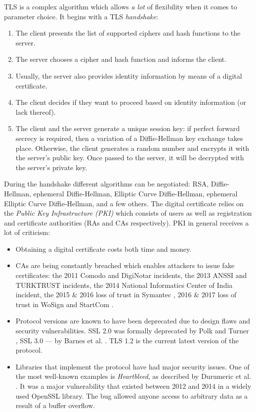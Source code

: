 TLS is a complex algorithm which allows \emph{a lot} of flexibility when it comes to parameter choice. It begins with a TLS \emph{handshake}:

\begin{enumerate}
    \item The client presents the list of supported ciphers and hash functions to the server.
    \item The server chooses a cipher and hash function and informs the client.
    \item Usually, the server also provides identity information by means of a digital certificate.
    \item The client decides if they want to proceed based on identity information (or lack thereof).
    \item The client and the server generate a unique session key: if perfect forward secrecy is required, then a variation of a Diffie-Hellman key exchange takes place. Otherwise, the client generates a random number and encrypts it with the server's public key. Once passed to the server, it will be decrypted with the server's private key.
  \end{enumerate}

During the handshake different algorithms can be negotiated: RSA, Diffie-Hellman, ephemeral Diffie-Hellman, Elliptic Curve Diffie-Hellman, ephemeral Elliptic Curve Diffie-Hellman, and a few others. The digital certificate relies on the \emph{Public Key Infrastructure (PKI)} which consists of users as well as registration and certificate authorities (RAs and CAs respectively). PKI in general receives a lot of criticism:

\begin{itemize}
    \item Obtaining a digital certificate costs both time and money.
    \item CAs are being constantly breached which enables attackers to issue fake certificates: the 2011 Comodo \cite{comodo:2017:ca-incident} and DigiNotar \cite{diginotar:2017:ca-incident} incidents, the 2013 ANSSI \cite{anssi:2017:ca-incident} and TURKTRUST \cite{turktrust:2017:ca-incident-0} incidents, the 2014 National Informatics Center of India \cite{nic:2017:ca-incident} incident, the 2015 \& 2016 loss of trust in Symantec \cite{symantec:2017:ca-incident-0, symantec:2017:ca-incident-1}, 2016 \& 2017 loss of trust in WoSign and StartCom \cite{startcom:2017:ca-incident-0, startcom:2017:ca-incident-1}.
    \item Protocol versions are known to have been deprecated due to design flaws and security vulnerabilities. SSL 2.0 was formally deprecated by Polk and Turner \cite{rfc6176}, SSL 3.0  --- by Barnes et al. \cite{rfc7568}. TLS 1.2 is the current latest version of the protocol.
    \item Libraries that implement the protocol have had major security issues. One of the most well-known examples is \emph{Heartbleed}, as described by Durumeric et al. \cite{durumeric2014matter}. It was a major vulnerability that existed between 2012 and 2014 in a widely used OpenSSL library. The bug allowed anyone access to arbitrary data as a result of a buffer overflow.
  \end{itemize}

